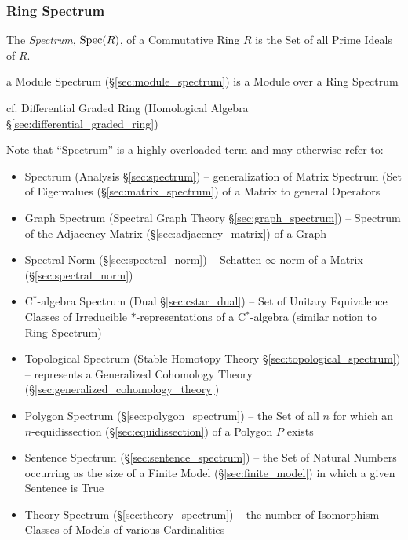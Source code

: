 \subsubsection{Ring Spectrum}\label{sec:ring_spectrum}

The \emph{Spectrum}, $\mathrm{Spec}(R)$, of a Commutative Ring $R$ is the Set of all
Prime Ideals of $R$.

a Module Spectrum (\S\ref{sec:module_spectrum}) is a Module over a Ring Spectrum

cf. Differential Graded Ring (Homological Algebra
\S\ref{sec:differential_graded_ring})

\fist Note that ``Spectrum'' is a highly overloaded term and may otherwise
refer to:
\begin{itemize}
  \item Spectrum (Analysis \S\ref{sec:spectrum}) -- generalization of Matrix
    Spectrum (Set of Eigenvalues (\S\ref{sec:matrix_spectrum}) of a Matrix to
    general Operators

  \item Graph Spectrum (Spectral Graph Theory \S\ref{sec:graph_spectrum}) --
    Spectrum of the Adjacency Matrix (\S\ref{sec:adjacency_matrix}) of a Graph

  \item Spectral Norm (\S\ref{sec:spectral_norm}) -- Schatten $\infty$-norm of
    a Matrix (\S\ref{sec:spectral_norm})

  \item C$^*$-algebra Spectrum (Dual \S\ref{sec:cstar_dual}) -- Set of Unitary
    Equivalence Classes of Irreducible $*$-representations of a C$^*$-algebra
    (similar notion to Ring Spectrum)

  \item Topological Spectrum (Stable Homotopy Theory
    \S\ref{sec:topological_spectrum}) -- represents a Generalized Cohomology
    Theory (\S\ref{sec:generalized_cohomology_theory})

  \item Polygon Spectrum (\S\ref{sec:polygon_spectrum}) -- the Set of all $n$
    for which an $n$-equidissection (\S\ref{sec:equidissection}) of a Polygon
    $P$ exists

  \item Sentence Spectrum (\S\ref{sec:sentence_spectrum}) -- the Set of Natural
    Numbers occurring as the size of a Finite Model (\S\ref{sec:finite_model})
    in which a given Sentence is True
  \item Theory Spectrum (\S\ref{sec:theory_spectrum}) -- the number of
    Isomorphism Classes of Models of various Cardinalities
\end{itemize}

